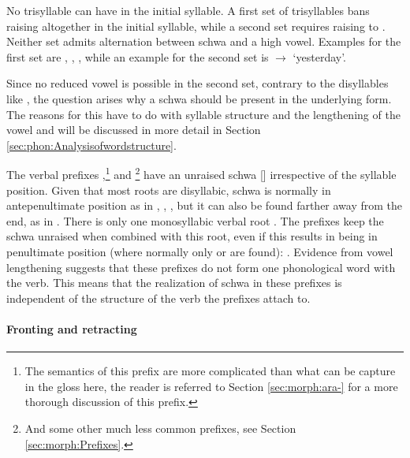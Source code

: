No trisyllable can have  in the initial syllable. A first set of trisyllables bans raising altogether in the initial syllable, while a second set requires raising to . Neither set admits alternation between schwa and a high vowel. Examples for the first set are
,
,
, while an example for the second set is  $\to$  `yesterday'.

Since no reduced vowel is possible in the second set, contrary to the disyllables like ,  the question arises why a schwa should be present in the underlying form. The reasons for this have to do with syllable structure and the lengthening of the vowel and will be discussed in more detail in Section \ref{sec:phon:Analysisofwordstructure}.


The verbal prefixes ,\footnote{The semantics of this prefix are more complicated than what can be capture in the gloss here, the reader is referred to Section \ref{sec:morph:ara-} for a more thorough discussion of this prefix.}
 and \footnote{And some other much less common prefixes, see Section \ref{sec:morph:Prefixes}.} have an unraised schwa [\E] irrespective of the syllable position. Given that most roots are disyllabic,  schwa is normally in antepenultimate position as in , , , but it can also be found farther away from the end, as in .  There is only one monosyllabic verbal root . The prefixes keep the schwa unraised when combined with this root, even if this results in \phonet{\E} being in penultimate position (where normally only  or  are found): . Evidence from vowel lengthening suggests that these prefixes do not form one phonological word with the verb. This means that the realization of schwa in these prefixes is independent of the structure of the verb the prefixes attach to.



\paragraph{Fronting and retracting}\label{sec:phon:allophonesofschwa:frontingandretracting}

